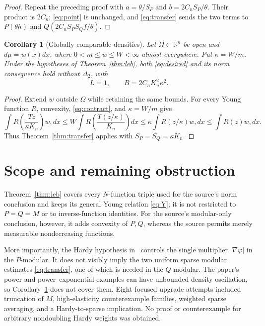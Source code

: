 \documentclass[11pt,a4paper]{article}
\newtheorem{corollary}[theorem]{Corollary}
\newcommand{\R}{\mathbb R}
\begin{document}
\begin{proof}
Repeat the preceding proof with
$a=\theta/S_P$ and $b=2C_nS_P/\theta$.  Their product is $2C_n$;
\eqref{eq:point} is unchanged, and \eqref{eq:transfer} sends the two terms to
$P(\theta h)$ and $Q(2C_nS_PS_Qf/\theta)$.
\end{proof}

\begin{corollary}[Globally comparable densities]\label{cor:density}
Let $\Omega\subset\R^n$ be open and $d\mu=w(x)dx$, where
$0<m\le w\le W<\infty$ almost everywhere.  Put $\kappa=W/m$.
Under the hypotheses of Theorem~\ref{thm:leb}, both \eqref{eq:desired} and
its norm consequence hold without $\Delta_2$, with
\[
 L=1,\qquad B=2C_nK_n^2\kappa^2.
\]
\end{corollary}

\begin{proof}
Extend $w$ outside $\Omega$ while retaining the same bounds.  For every Young
function $R$, convexity, \eqref{eq:contract}, and $\kappa=W/m$ give
\[
 \int R\!\left(\frac{Tz}{\kappa K_n}\right)w,dx
 \le W\int R\!\left(\frac{T(z/\kappa)}{K_n}\right)dx
 \le \kappa\int R(z/\kappa)w,dx
 \le \int R(z)w,dx.
\]
Thus Theorem~\ref{thm:transfer} applies with
$S_P=S_Q=\kappa K_n$.
\end{proof}

\section{Scope and remaining obstruction}

Theorem~\ref{thm:leb} covers every $N$-function triple used for the source's
norm conclusion and keeps its general Young relation \eqref{eq:Y}; it is not
restricted to $P=Q=M$ or to inverse-function identities.  For the source's
modular-only conclusion, however, it adds convexity of $P,Q$, whereas the
source permits merely measurable nondecreasing functions.

More importantly, the Hardy hypothesis in~\cite{KP} controls the single
multiplier $|\nabla\varphi|$ in the $P$-modular.  It does not visibly imply
the two uniform sparse modular estimates \eqref{eq:transfer}, one of which is
needed in the $Q$-modular.  The paper's power and power--exponential examples
can have unbounded density oscillation, so Corollary~\ref{cor:density} does
not cover them.  Eight focused upgrade attempts included truncation of $M$,
high-elasticity counterexample families, weighted sparse averaging, and a
Hardy-to-sparse implication.  No proof or counterexample for arbitrary
nondoubling Hardy weights was obtained.
\end{document}
